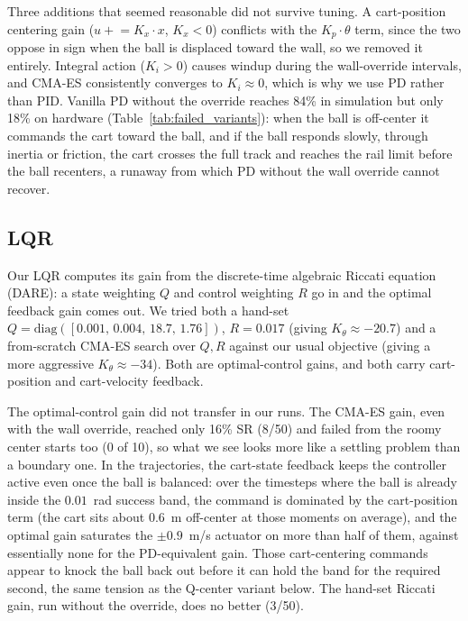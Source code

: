 Three additions that seemed reasonable did not survive tuning. A cart-position
centering gain ($u \mathrel{+}= K_x \cdot x$, $K_x < 0$) conflicts with the $K_p \cdot \theta$ term,
since the two oppose in sign when the ball is displaced toward the wall, so we
removed it entirely. Integral action ($K_i > 0$) causes windup during the
wall-override intervals, and CMA-ES consistently converges to
$K_i \approx 0$, which is why we use PD rather than PID. Vanilla PD without
the override reaches 84\% in simulation but only 18\% on hardware
(Table~\ref{tab:failed_variants}): when the ball is off-center it commands the
cart toward the ball, and if the ball responds slowly, through inertia or
friction, the cart crosses the full track and reaches the rail limit before
the ball recenters, a runaway from which PD without the wall override cannot
recover.

\subsection{LQR}

Our LQR computes its gain from the discrete-time algebraic Riccati equation
(DARE): a state weighting $Q$ and control weighting $R$ go in and the optimal
feedback gain comes out. We tried both a hand-set
$Q = \text{diag}([0.001,\, 0.004,\, 18.7,\, 1.76])$, $R = 0.017$ (giving
$K_\theta \approx -20.7$) and a from-scratch CMA-ES search over $Q, R$ against
our usual objective (giving a more aggressive $K_\theta \approx -34$). Both are
optimal-control gains, and both carry cart-position and cart-velocity feedback.

The optimal-control gain did not transfer in our runs. The CMA-ES gain, even
with the wall override, reached only 16\% SR (8/50) and failed from the roomy
center starts too (0 of 10), so what we see looks more like a settling problem
than a boundary one. In the trajectories, the cart-state feedback keeps the
controller active even once the ball is balanced: over the timesteps where the
ball is already inside the $0.01$~rad success band, the command is dominated by
the cart-position term (the cart sits about $0.6$~m off-center at those moments
on average), and the optimal gain saturates the $\pm 0.9$~m/s actuator on more
than half of them, against essentially none for the PD-equivalent gain. Those
cart-centering commands appear to knock the ball back out before it can hold the
band for the required second, the same tension as the Q-center variant below.
The hand-set Riccati gain, run without the override, does no better (3/50).

